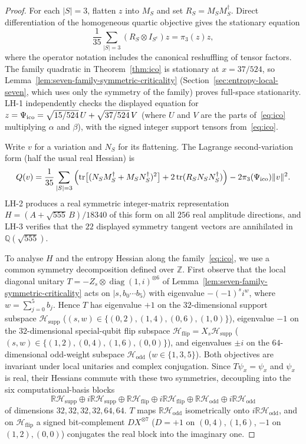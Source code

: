 \begin{proof}
For each $|S|=3$, flatten $z$ into $M_S$ and set
$R_S=M_SM_S^\dagger$. Direct differentiation of the homogeneous
quartic objective gives the stationary equation
\[
   \frac1{35}\sum_{|S|=3}(R_S\otimes I_{S^c})z=\pi_3(z)z,
\]
where the operator notation includes the canonical reshuffling of tensor
factors. The family quadratic in Theorem~\ref{thm:ico} is stationary at
$x=37/524$, so Lemma~\ref{lem:seven-family-symmetric-criticality} (Section~\ref{sec:entropy-local-seven}, which uses only the symmetry of the family) proves
full-space stationarity. LH-1 independently checks the displayed equation
for $z=\Psi_{\mathrm{ico}}=\sqrt{15/524}\,U+\sqrt{37/524}\,V$ (where $U$ and $V$ are the parts of~\eqref{eq:ico} multiplying $\alpha$ and $\beta$), with the signed
integer support tensors from~\eqref{eq:ico}.

Write $v$ for a variation and $N_S$ for its flattening. The Lagrange
second-variation form (half the usual real Hessian) is
\[
 Q(v)=\frac1{35}\sum_{|S|=3}
 \left(\operatorname{tr}\bigl[(N_SM_S^\dagger+M_SN_S^\dagger)^2\bigr]+
 2\operatorname{tr}(R_SN_SN_S^\dagger)\right)-2\pi_3(\Psi_{\mathrm{ico}})\|v\|^2.
\]
LH-2 produces a real symmetric integer-matrix representation
$H=(A+\sqrt{555}\,B)/18340$ of this form on all $256$ real amplitude
directions, and LH-3 verifies that the $22$ displayed symmetry tangent
vectors are annihilated in $\mathbb Q(\sqrt{555})$.

To analyse $H$ and the entropy Hessian along the family~\eqref{eq:ico}, we use a common symmetry decomposition defined over $\mathbb Z$.
First observe that the local diagonal unitary
$T=-Z_s\otimes\operatorname{diag}(1,i)^{\otimes6}$ of Lemma~\ref{lem:seven-family-symmetric-criticality}
acts on $|s,b_0\cdots b_5\rangle$ with eigenvalue $-(-1)^s i^w$, where $w=\sum_{j=0}^5 b_j$.
Hence $T$ has eigenvalue $+1$ on the $32$-dimensional support subspace
$\mathcal H_{\mathrm{supp}}$ ($(s,w)\in\{(0,2),(1,4),(0,6),(1,0)\}$), eigenvalue $-1$ on the
$32$-dimensional special-qubit flip subspace $\mathcal H_{\mathrm{flip}}=X_s\mathcal H_{\mathrm{supp}}$
($(s,w)\in\{(1,2),(0,4),(1,6),(0,0)\}$), and eigenvalues $\pm i$ on the $64$-dimensional odd-weight
subspace $\mathcal H_{\mathrm{odd}}$ ($w\in\{1,3,5\}$). Both objectives are invariant under local unitaries and complex conjugation. Since $T\psi_x=\psi_x$ and
$\psi_x$ is real, their Hessians commute with these two symmetries, decoupling into the six computational-basis blocks
\begin{equation}\label{eq:ico-hessian-six-blocks}
 \mathbb R\mathcal H_{\mathrm{supp}}\oplus i\mathbb R\mathcal H_{\mathrm{supp}}\oplus
 \mathbb R\mathcal H_{\mathrm{flip}}\oplus i\mathbb R\mathcal H_{\mathrm{flip}}\oplus
 \mathbb R\mathcal H_{\mathrm{odd}}\oplus i\mathbb R\mathcal H_{\mathrm{odd}}
\end{equation}
of dimensions $32,32,32,32,64,64$. $T$ maps $\mathbb R\mathcal H_{\mathrm{odd}}$ isometrically onto
$i\mathbb R\mathcal H_{\mathrm{odd}}$, and on $\mathcal H_{\mathrm{flip}}$ a signed bit-complement $DX^{\otimes7}$
($D=+1$ on $(0,4),(1,6)$, $-1$ on $(1,2),(0,0)$) conjugates the real block into the imaginary one.


\end{proof}
